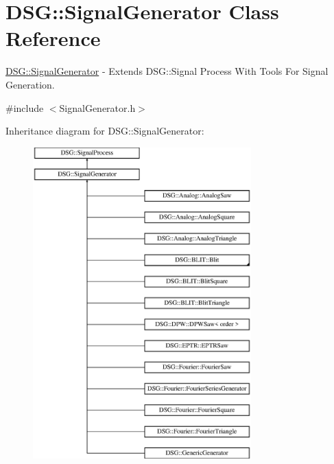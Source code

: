 \hypertarget{class_d_s_g_1_1_signal_generator}{\section{D\+S\+G\+:\+:Signal\+Generator Class Reference}
\label{class_d_s_g_1_1_signal_generator}
}


\hyperlink{class_d_s_g_1_1_signal_generator}{D\+S\+G\+::\+Signal\+Generator} -\/ Extends D\+S\+G\+::\+Signal Process With Tools For Signal Generation.  




{\ttfamily \#include $<$Signal\+Generator.\+h$>$}

Inheritance diagram for D\+S\+G\+:\+:Signal\+Generator\+:\begin{figure}[H]
\begin{center}
\leavevmode
\includegraphics[height=12.000000cm]{class_d_s_g_1_1_signal_generator}
\end{center}
\end{figure}
